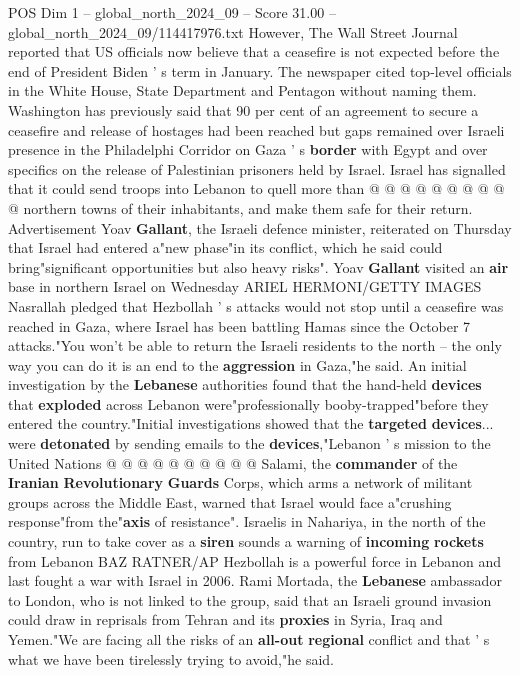 \begin{textsample}{POS Dim 1 – global\_north\_2024\_09 – Score 31.00 – global\_north\_2024\_09/114417976.txt}
However, The Wall Street Journal reported that US officials now believe that a ceasefire is not expected before the end of President Biden ' s term in January.
The newspaper cited top-level officials in the White House, State Department and Pentagon without naming them.
Washington has previously said that 90 per cent of an agreement to secure a ceasefire and release of hostages had been reached but gaps remained over Israeli presence in the Philadelphi Corridor on Gaza ' s \textbf{border} with Egypt and over specifics on the release of Palestinian prisoners held by Israel.
Israel has signalled that it could send troops into Lebanon to quell more than @ @ @ @ @ @ @ @ @ @ northern towns of their inhabitants, and make them safe for their return.
Advertisement Yoav \textbf{Gallant}, the Israeli defence minister, reiterated on Thursday that Israel had entered a"new phase"in its conflict, which he said could bring"significant opportunities but also heavy risks".
Yoav \textbf{Gallant} visited an \textbf{air} base in northern Israel on Wednesday ARIEL HERMONI/GETTY IMAGES Nasrallah pledged that Hezbollah ' s attacks would not stop until a ceasefire was reached in Gaza, where Israel has been battling Hamas since the October 7 attacks."You won't be able to return the Israeli residents to the north -- the only way you can do it is an end to the \textbf{aggression} in Gaza,"he said.
An initial investigation by the \textbf{Lebanese} authorities found that the hand-held \textbf{devices} that \textbf{exploded} across Lebanon were"professionally booby-trapped"before they entered the country."Initial investigations showed that the \textbf{targeted} \textbf{devices}... were \textbf{detonated} by sending emails to the \textbf{devices},"Lebanon ' s mission to the United Nations @ @ @ @ @ @ @ @ @ @ Salami, the \textbf{commander} of the \textbf{Iranian} \textbf{Revolutionary} \textbf{Guards} Corps, which arms a network of militant groups across the Middle East, warned that Israel would face a"crushing response"from the"\textbf{axis} of resistance".
Israelis in Nahariya, in the north of the country, run to take cover as a \textbf{siren} sounds a warning of \textbf{incoming} \textbf{rockets} from Lebanon BAZ RATNER/AP Hezbollah is a powerful force in Lebanon and last fought a war with Israel in 2006.
Rami Mortada, the \textbf{Lebanese} ambassador to London, who is not linked to the group, said that an Israeli ground invasion could draw in reprisals from Tehran and its \textbf{proxies} in Syria, Iraq and Yemen."We are facing all the risks of an \textbf{all-out} \textbf{regional} conflict and that ' s what we have been tirelessly trying to avoid,"he said.

\end{textsample}
